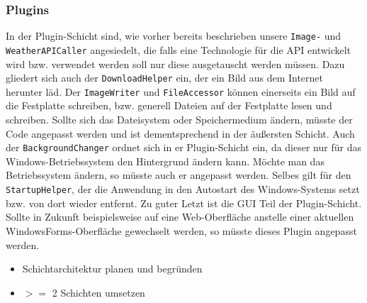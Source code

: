 \subsubsection{Plugins}
In der Plugin-Schicht sind, wie vorher bereits beschrieben unsere \texttt{Image-} und \texttt{WeatherAPICaller} angesiedelt, die falls eine Technologie für die API entwickelt wird bzw. verwendet werden soll nur diese ausgetauscht werden müssen. Dazu gliedert sich auch der \texttt{DownloadHelper} ein, der ein Bild aus dem Internet herunter läd. Der \texttt{ImageWriter} und \texttt{FileAccessor} können einerseits ein Bild auf die Festplatte schreiben, bzw. generell Dateien auf der Festplatte lesen und schreiben. Sollte sich das Dateisystem oder Speichermedium ändern, müsste der Code angepasst werden und ist dementsprechend in der äußersten Schicht. Auch der \texttt{BackgroundChanger} ordnet sich in er Plugin-Schicht ein, da dieser nur für das Windows-Betriebssystem den Hintergrund ändern kann. Möchte man das Betriebssystem ändern, so müsste auch er angepasst werden. Selbes gilt für den \texttt{StartupHelper}, der die Anwendung in den Autostart des Windows-Systems setzt bzw. von dort wieder entfernt. Zu guter Letzt ist die GUI Teil der Plugin-Schicht. Sollte in Zukunft beispielsweise auf eine Web-Oberfläche anstelle einer aktuellen WindowsForms-Oberfläche gewechselt werden, so müsste dieses Plugin angepasst werden.
\begin{itemize}
	\item Schichtarchitektur planen und begründen
	\item $>=$ 2 Schichten umsetzen
\end{itemize}
